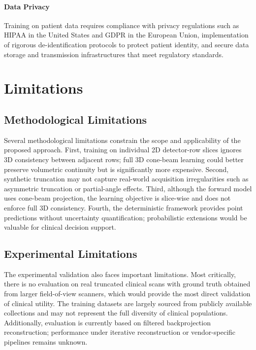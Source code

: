 \paragraph{Data Privacy} Training on patient data requires compliance with privacy regulations such as HIPAA in the United States and GDPR in the European Union, implementation of rigorous de-identification protocols to protect patient identity, and secure data storage and transmission infrastructures that meet regulatory standards.

\section{Limitations}

\subsection{Methodological Limitations}

Several methodological limitations constrain the scope and applicability of the proposed approach. First, training on individual 2D detector-row slices ignores 3D consistency between adjacent rows; full 3D cone-beam learning could better preserve volumetric continuity but is significantly more expensive. Second, synthetic truncation may not capture real-world acquisition irregularities such as asymmetric truncation or partial-angle effects. Third, although the forward model uses cone-beam projection, the learning objective is slice-wise and does not enforce full 3D consistency. Fourth, the deterministic framework provides point predictions without uncertainty quantification; probabilistic extensions would be valuable for clinical decision support.

\subsection{Experimental Limitations}

The experimental validation also faces important limitations. Most critically, there is no evaluation on real truncated clinical scans with ground truth obtained from larger field-of-view scanners, which would provide the most direct validation of clinical utility. The training datasets are largely sourced from publicly available collections and may not represent the full diversity of clinical populations. Additionally, evaluation is currently based on filtered backprojection reconstruction; performance under iterative reconstruction or vendor-specific pipelines remains unknown.

